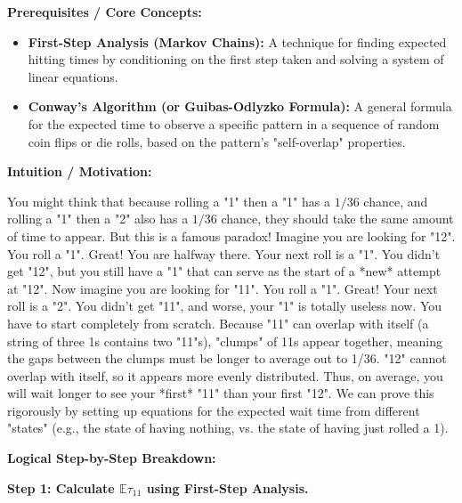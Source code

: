 \begin{solution}
\textbf{Prerequisites / Core Concepts:}
\begin{itemize}
    \item \textbf{First-Step Analysis (Markov Chains):} A technique for finding expected hitting times by conditioning on the first step taken and solving a system of linear equations.
    \item \textbf{Conway's Algorithm (or Guibas-Odlyzko Formula):} A general formula for the expected time to observe a specific pattern in a sequence of random coin flips or die rolls, based on the pattern's "self-overlap" properties.
\end{itemize}

\textbf{Intuition / Motivation:}

You might think that because rolling a "1" then a "1" has a $1/36$ chance, and rolling a "1" then a "2" also has a $1/36$ chance, they should take the same amount of time to appear. But this is a famous paradox!
Imagine you are looking for "12". You roll a "1". Great! You are halfway there. Your next roll is a "1". You didn't get "12", but you still have a "1" that can serve as the start of a *new* attempt at "12".
Now imagine you are looking for "11". You roll a "1". Great! Your next roll is a "2". You didn't get "11", and worse, your "1" is totally useless now. You have to start completely from scratch. 
Because "11" can overlap with itself (a string of three 1s contains two "11"s), "clumps" of 11s appear together, meaning the gaps between the clumps must be longer to average out to 1/36. "12" cannot overlap with itself, so it appears more evenly distributed. Thus, on average, you will wait longer to see your *first* "11" than your first "12".
We can prove this rigorously by setting up equations for the expected wait time from different "states" (e.g., the state of having nothing, vs. the state of having just rolled a 1).

\textbf{Logical Step-by-Step Breakdown:}

\textbf{Step 1: Calculate $\mathbb{E}\tau_{11}$ using First-Step Analysis.}


\end{solution}
